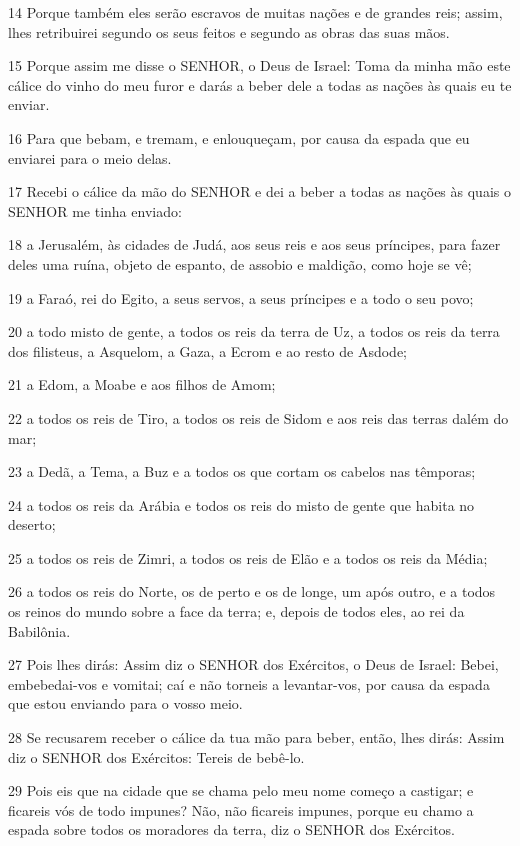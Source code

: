 \par 14 Porque também eles serão escravos de muitas nações e de grandes reis; assim, lhes retribuirei segundo os seus feitos e segundo as obras das suas mãos.
\par 15 Porque assim me disse o SENHOR, o Deus de Israel: Toma da minha mão este cálice do vinho do meu furor e darás a beber dele a todas as nações às quais eu te enviar.
\par 16 Para que bebam, e tremam, e enlouqueçam, por causa da espada que eu enviarei para o meio delas.
\par 17 Recebi o cálice da mão do SENHOR e dei a beber a todas as nações às quais o SENHOR me tinha enviado:
\par 18 a Jerusalém, às cidades de Judá, aos seus reis e aos seus príncipes, para fazer deles uma ruína, objeto de espanto, de assobio e maldição, como hoje se vê;
\par 19 a Faraó, rei do Egito, a seus servos, a seus príncipes e a todo o seu povo;
\par 20 a todo misto de gente, a todos os reis da terra de Uz, a todos os reis da terra dos filisteus, a Asquelom, a Gaza, a Ecrom e ao resto de Asdode;
\par 21 a Edom, a Moabe e aos filhos de Amom;
\par 22 a todos os reis de Tiro, a todos os reis de Sidom e aos reis das terras dalém do mar;
\par 23 a Dedã, a Tema, a Buz e a todos os que cortam os cabelos nas têmporas;
\par 24 a todos os reis da Arábia e todos os reis do misto de gente que habita no deserto;
\par 25 a todos os reis de Zimri, a todos os reis de Elão e a todos os reis da Média;
\par 26 a todos os reis do Norte, os de perto e os de longe, um após outro, e a todos os reinos do mundo sobre a face da terra; e, depois de todos eles, ao rei da Babilônia.
\par 27 Pois lhes dirás: Assim diz o SENHOR dos Exércitos, o Deus de Israel: Bebei, embebedai-vos e vomitai; caí e não torneis a levantar-vos, por causa da espada que estou enviando para o vosso meio.
\par 28 Se recusarem receber o cálice da tua mão para beber, então, lhes dirás: Assim diz o SENHOR dos Exércitos: Tereis de bebê-lo.
\par 29 Pois eis que na cidade que se chama pelo meu nome começo a castigar; e ficareis vós de todo impunes? Não, não ficareis impunes, porque eu chamo a espada sobre todos os moradores da terra, diz o SENHOR dos Exércitos.
